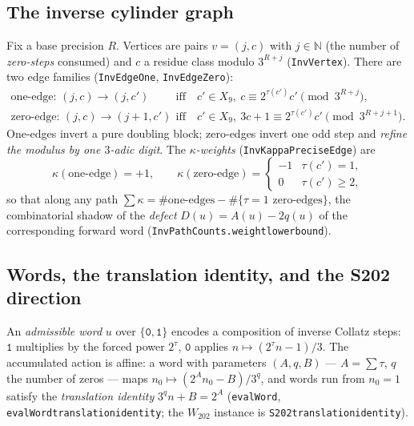 \documentclass[11pt]{amsart}
\theoremstyle{definition}
\theoremstyle{remark}
\newcommand{\lean}[1]{{\def\_{\textunderscore\allowbreak}\texttt{#1}}}
\newcommand{\N}{\mathbb{N}}
\begin{document}
\subsection{The inverse cylinder graph}
Fix a base precision $R$.  Vertices are pairs $v = (j, c)$ with $j \in \N$
(the number of \emph{zero-steps} consumed) and $c$ a residue class modulo
$3^{R+j}$ (\lean{InvVertex}).  There are two edge families
(\lean{InvEdgeOne}, \lean{InvEdgeZero}):
\begin{align*}
\text{one-edge: } (j,c) \to (j,c') &\quad\text{iff}\quad
  c' \in X_9,\ c \equiv 2^{\tau(c')} c' \pmod{3^{R+j}},\\
\text{zero-edge: } (j,c) \to (j{+}1,c') &\quad\text{iff}\quad
  c' \in X_9,\ 3c+1 \equiv 2^{\tau(c')} c' \pmod{3^{R+j+1}}.
\end{align*}
One-edges invert a pure doubling block; zero-edges invert one odd step and
\emph{refine the modulus by one $3$-adic digit}.  The
\emph{$\kappa$-weights} (\lean{InvKappaPreciseEdge}) are
\[
\kappa(\text{one-edge}) = +1,\qquad
\kappa(\text{zero-edge}) = \begin{cases}-1 & \tau(c')=1,\\ 0 & \tau(c')\ge 2,\end{cases}
\]
so that along any path $\sum \kappa = \#\text{one-edges} -
\#\{\tau{=}1\text{ zero-edges}\}$, the combinatorial shadow of the
\emph{defect} $D(u) = A(u) - 2q(u)$ of the corresponding forward word
(\lean{InvPathCounts.weight\_lower\_bound}).

\subsection{Words, the translation identity, and the S202 direction}
\label{subsec:s202}
An \emph{admissible word} $u$ over $\{\mathtt{0},\mathtt{1}\}$ encodes a
composition of inverse Collatz steps: $\mathtt{1}$ multiplies by the forced
power $2^{\tau}$, $\mathtt{0}$ applies $n \mapsto (2^{\tau}n - 1)/3$.  The
accumulated action is affine: a word with parameters $(A, q, B)$ ---
$A = \sum \tau$, $q$ the number of zeros --- maps
$n_0 \mapsto (2^{A} n_0 - B)/3^{q}$, and words run from $n_0 = 1$ satisfy
the \emph{translation identity} $3^{q} n + B = 2^{A}$
(\lean{evalWord}, \lean{evalWord\_translation\_identity}; the $W_{202}$
instance is \lean{S202\_translation\_identity}).
\end{document}
